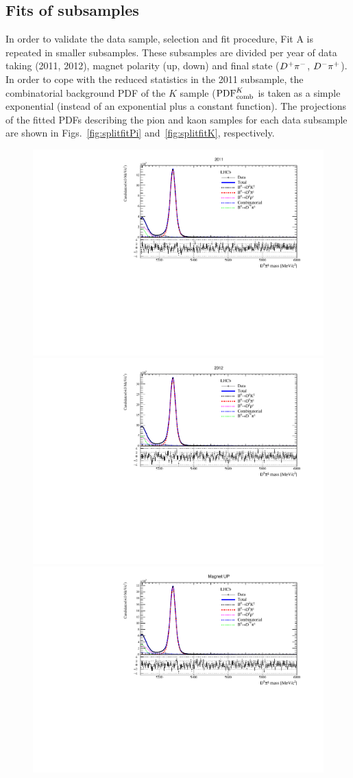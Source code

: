 \subsection{Fits of subsamples}
\label{sec:split}
In order to validate the data sample, selection and fit procedure,
Fit A is repeated in smaller subsamples. These subsamples are divided per year of data taking
(2011, 2012), magnet polarity (up, down) and final state ($D^+\pi^-$, $D^-\pi^+$).
In order to cope with the reduced statistics in the 2011 subsample, the combinatorial background PDF of the $K$ sample (${\rm{PDF}}^{K}_{\rm comb}$ is taken as a simple exponential (instead of an exponential plus a constant function).
The projections of the fitted PDFs describing the pion and kaon samples for each data
subsample are shown in Figs.~\ref{fig:splitfitPi}
and~\ref{fig:splitfitK}, respectively.
\begin{figure}[t]
	\begin{center}
		\includegraphics[width=0.48\linewidth]{03Massfit/figs/MDFitPlots_Bd_2011/MDFit_BeautyMass_Bd2DPi_withPulls.pdf}
		\includegraphics[width=0.48\linewidth]{03Massfit/figs/MDFitPlots_Bd_2012/MDFit_BeautyMass_Bd2DPi_withPulls.pdf} \\
		\includegraphics[width=0.48\linewidth]{03Massfit/figs/MDFitPlots_Bd_MU/MDFit_BeautyMass_Bd2DPi_withPulls.pdf}

\end{center}
\end{figure}
